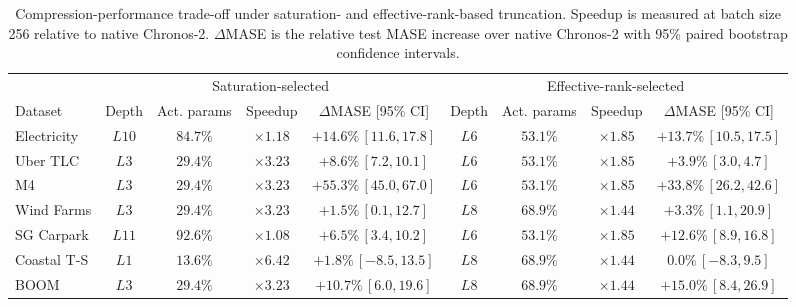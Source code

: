 \documentclass{article}
\begin{document}
\begin{table}[t]
    \centering
    \scriptsize
    \setlength{\tabcolsep}{2.5pt}
    \renewcommand{\arraystretch}{0.95}

    \caption{
    Compression-performance trade-off under saturation- and effective-rank-based truncation.
    Speedup is measured at batch size 256 relative to native Chronos-2.
    \(\Delta\)MASE is the relative test MASE increase over native Chronos-2 with 95\% paired bootstrap confidence intervals.
    }
    \label{tab:compression-selection}

    \begin{tabular}{lcccccccc}
    \toprule
    & \multicolumn{4}{c}{Saturation-selected}
    & \multicolumn{4}{c}{Effective-rank-selected} \\
    \cmidrule(lr){2-5}
    \cmidrule(lr){6-9}
    Dataset
    & Depth & Act. params & Speedup & \(\Delta\)MASE [95\% CI]
    & Depth & Act. params & Speedup & \(\Delta\)MASE [95\% CI] \\
    \midrule

    Electricity
    & \(L10\) & \(84.7\%\) & \(\times 1.18\) & \(+14.6\%\,[11.6,17.8]\)
    & \(L6\) & \(53.1\%\) & \(\times 1.85\) & \(+13.7\%\,[10.5,17.5]\) \\

    Uber TLC
    & \(L3\) & \(29.4\%\) & \(\times 3.23\) & \(+8.6\%\,[7.2,10.1]\)
    & \(L6\) & \(53.1\%\) & \(\times 1.85\) & \(+3.9\%\,[3.0,4.7]\) \\

    M4
    & \(L3\) & \(29.4\%\) & \(\times 3.23\) & \(+55.3\%\,[45.0,67.0]\)
    & \(L6\) & \(53.1\%\) & \(\times 1.85\) & \(+33.8\%\,[26.2,42.6]\) \\

    Wind Farms
    & \(L3\) & \(29.4\%\) & \(\times 3.23\) & \(+1.5\%\,[0.1,12.7]\)
    & \(L8\) & \(68.9\%\) & \(\times 1.44\) & \(+3.3\%\,[1.1,20.9]\) \\

    \midrule

    SG Carpark
    & \(L11\) & \(92.6\%\) & \(\times 1.08\) & \(+6.5\%\,[3.4,10.2]\)
    & \(L6\) & \(53.1\%\) & \(\times 1.85\) & \(+12.6\%\,[8.9,16.8]\) \\

    Coastal T-S
    & \(L1\) & \(13.6\%\) & \(\times 6.42\) & \(+1.8\%\,[{-8.5},13.5]\)
    & \(L8\) & \(68.9\%\) & \(\times 1.44\) & \(0.0\%\,[{-8.3},9.5]\) \\

    BOOM
    & \(L3\) & \(29.4\%\) & \(\times 3.23\) & \(+10.7\%\,[6.0,19.6]\)
    & \(L8\) & \(68.9\%\) & \(\times 1.44\) & \(+15.0\%\,[8.4,26.9]\) \\

    \bottomrule
\end{tabular}
\end{table}
\end{document}
